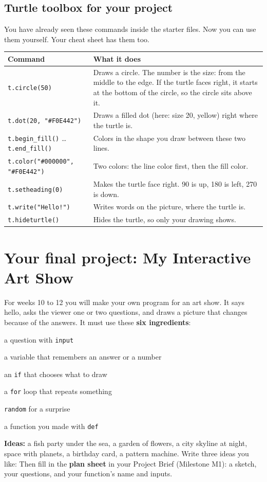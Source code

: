 \subsection{Turtle toolbox for your project}
You have already seen these commands inside the starter files. Now you can use them yourself. Your cheat sheet has them too.
\begin{center}
\renewcommand{\arraystretch}{1.35}
\begin{tabularx}{\linewidth}{@{}p{6.4cm}>{\raggedright\arraybackslash}X@{}}
\toprule
Command & What it does\\
\midrule
\texttt{t.circle(50)} & Draws a circle. The number is the size: from the middle to the edge. If the turtle faces right, it starts at the bottom of the circle, so the circle sits above it.\\
\texttt{t.dot(20, "\#F0E442")} & Draws a filled dot (here: size 20, yellow) right where the turtle is.\\
\texttt{t.begin\_fill()} \ldots{} \texttt{t.end\_fill()} & Colors in the shape you draw between these two lines.\\
\texttt{t.color("\#000000", "\#F0E442")} & Two colors: the line color first, then the fill color.\\
\texttt{t.setheading(0)} & Makes the turtle face right. 90 is up, 180 is left, 270 is down.\\
\texttt{t.write("Hello!")} & Writes words on the picture, where the turtle is.\\
\texttt{t.hideturtle()} & Hides the turtle, so only your drawing shows.\\
\bottomrule
\end{tabularx}
\end{center}

\section{Your final project: My Interactive Art Show}
For weeks 10 to 12 you will make your own program for an art show. It says hello, asks the viewer one or two questions, and draws a picture that changes because of the answers. It must use these \textbf{six ingredients}:
\begin{checklist}
  \item a question with \texttt{input}
  \item a variable that remembers an answer or a number
  \item an \texttt{if} that chooses what to draw
  \item a \texttt{for} loop that repeats something
  \item \texttt{random} for a surprise
  \item a function you made with \texttt{def}
\end{checklist}
\textbf{Ideas:} a fish party under the sea, a garden of flowers, a city skyline at night, space with planets, a birthday card, a pattern machine. Write three ideas you like:
Then fill in the \textbf{plan sheet} in your Project Brief (Milestone M1): a sketch, your questions, and your function's name and inputs.

